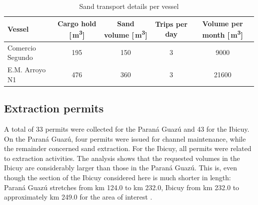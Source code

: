 


\begin{table}[H]
\centering
\caption{Sand transport details per vessel}
\begin{tabular}{lcccc}
\hline
Vessel & Cargo hold [\,m\textsuperscript{3}] & Sand volume [\,m\textsuperscript{3}] & Trips per day & Volume per month [\,m\textsuperscript{3}] \\
\hline
Comercio Segundo & 195 & 150 & 3 & 9000 \\
E.M. Arroyo N1 & 476 & 360 & 3 & 21600 \\
\hline
\end{tabular}

\label{tab:sand_volume}
\end{table}

\subsection{Extraction permits}
A total of 33 permits were collected for the Paraná Guazú and 43 for the Ibicuy. On the Paraná Guazú, four permits were issued for channel maintenance, while the remainder concerned sand extraction. For the Ibicuy, all permits were related to extraction activities. The analysis shows that the requested volumes in the Ibicuy are considerably larger than those in the Paraná Guazú. This is, even though the section of the Ibicuy considered here is much shorter in length: Paraná Guazú stretches from km 124.0 to km 232.0, Ibicuy from km 232.0 to approximately km 249.0 for the area of interest \autocite{administraciongeneraldepuertoss.a.u.AGPComenzoBatimetria2023}.

